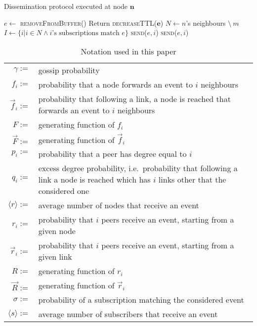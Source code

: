 \documentclass[10pt, conference, compsocconf]{IEEEtran}
\begin{document}
\begin{algorithm}[t]
\caption{Dissemination protocol executed at node $\mathbf{n}$}
\label{alg:protocol}
\begin{small}
\begin{algorithmic}[1]
\STATE $e \leftarrow$ \textsc{removeFromBuffer}()
 \label{alg:b_handled} 
  \STATE Return
\ENDIF \label{alg:e_handled}
\STATE \textsc{decreaseTTL}($\mathbf{e}$)
\STATE $N \leftarrow n$'s neighbours $\setminus \ m$\hfill{} \label{alg:b_f}
\STATE $I \leftarrow \{i | i \in N \wedge i\text{'s subscriptions match } e\}$
 \hfill{}
  \STATE \textsc{send}($e, i$)\ENDFOR \label{alg:e_f}
 \hfill{}\label{alg:b_gossip}
       \STATE \textsc{send}($e,i$)\ENDIF \ENDFOR \label{alg:e_gossip}
\end{algorithmic}
\end{small}
\end{algorithm}


\begin{table}[t]
\centering \begin{tabular}{rp{}}
\toprule
$\gamma :=$ & gossip probability\\
$f_i :=$ & probability that a node forwards an event to $i$ neighbours\\
$\overrightarrow{f}_i :=$ & probability that following a link, a node is reached that forwards an event to $i$ neighbours\\
$F :=$ & generating function of $f_i$\\
$\overrightarrow{F} :=$ & generating function of $\overrightarrow{f}_i$\\
$p_i :=$ & probability that a peer has degree equal to $i$\\
$q_i :=$ & excess degree probability, i.e.~probability that following a link a node is reached which has $i$ links other that the considered one\\
$\langle r \rangle :=$ & average number of nodes that receive an event\\
$r_i :=$ & probability that $i$ peers receive an event, starting from a given node\\
$\overrightarrow{r}_i :=$ & probability that $i$ peers receive an event, starting from a given link\\
$R :=$ & generating function of $r_i$\\
$\overrightarrow{R} :=$ & generating function of $\overrightarrow{r}_i$\\
$\sigma :=$ & probability of a subscription matching the considered event\\
$\langle s \rangle :=$ & average number of subscribers that receive an event\\
\bottomrule
\end{tabular}
\caption{Notation used in this paper}\label{tab:notation}
\end{table}
\end{document}
